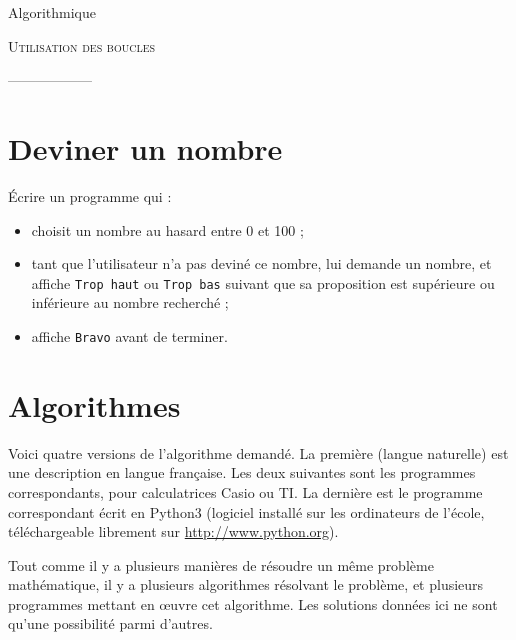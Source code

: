 \documentclass[12pt]{article}
\begin{document}
\begin{center}
  Algorithmique

  {\large
    \textsc{Utilisation des boucles}
  }

  ------------------
\end{center}

\section*{Deviner un nombre}

Écrire un programme qui :
\begin{itemize}
  \item choisit un nombre au hasard entre 0 et 100 ;
  \item tant que l'utilisateur n'a pas deviné ce nombre, lui demande un nombre, et affiche \texttt{Trop haut} ou \texttt{Trop bas} suivant que sa proposition est supérieure ou inférieure au nombre recherché ;
  \item affiche \texttt{Bravo} avant de terminer.
\end{itemize}

\section*{Algorithmes}

Voici quatre versions de l'algorithme demandé. La première (langue naturelle)
est une description en langue française. Les deux suivantes sont les programmes
correspondants, pour calculatrices Casio ou TI. La dernière est le programme
correspondant écrit en Python3 (logiciel installé sur les ordinateurs de
l'école, téléchargeable librement sur \url{http://www.python.org}).

Tout comme il y a plusieurs manières de résoudre un même problème mathématique,
il y a plusieurs algorithmes résolvant le problème, et plusieurs programmes
mettant en œuvre cet algorithme. Les solutions données ici ne sont qu'une
possibilité parmi d'autres.
\end{document}
